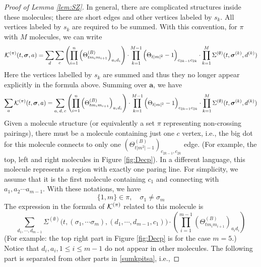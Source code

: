 \documentclass[10pt,reqno]{article}
\theoremstyle{plain} %
\theoremstyle{remark}
\numberwithin{equation}{section}
\begin{document}
\begin{proof}[ Proof of Lemma  \ref{lem:SZ}]
In general, there are complicated structures inside these molecules; there are short edges and other vertices labeled by $s_k$. All vertices labeled by $s_k$
 are required to be summed. 
With this convention,  for $\pi$  with   $M$ molecules, we can write 
\begin{align}\label{KThThSigma}
{\cal K}^{(\pi)}(t, \boldsymbol{\sigma}, \textbf{a})= 
\sum_{\textbf{d}}\sum_{\textbf{c}}\left(\prod_{i=1}^{n} \left(\Theta^{(B)}_{tm_im_{i+1}}\right)_{a_id_i}\right)\cdot \prod_{k=1}^{M-1}\Big(\Theta_{{t|m|^2}}-1\Big)_{c_{2k-1}c_{2k}}
\cdot
 \prod_{k=1}^{M}{\Sigma}^{(\emptyset)}(t, \boldsymbol{\sigma}^{(k)}, \textbf{d}^{(k)})   
\end{align}
Here the vertices labelled by $s_k$ are summed and thus they no longer appear explicitly in the formula above. 
Summing over  $\textbf{a}$,  we have 
\begin{align}\label{sumkpitsa}
\sum_{\textbf{a}}{\cal K}^{(\pi)}(t, \boldsymbol{\sigma}, \textbf{a})=
\sum_{\textbf{a},\,\textbf{d},\,\textbf{c}}\left(\prod_{i=1}^{n}  \left(\Theta^{(B)}_{tm_im_{i+1}}\right)_{a_id_i}\right)\cdot \prod_{k=1}^{M-1}\Big(\Theta_{{t|m|^2}}-1\Big)_{c_{2k-1}c_{2k}}
\cdot
 \prod_{k=1}^{M}{\Sigma}^{(\emptyset)}(t, \boldsymbol{\sigma}^{(k)}, \textbf{d}^{(k)})   
\end{align}
 Given a molecule structure (or equivalently a set $\pi$ representing non-crossing pairings), there must be a molecule  containing just one $c$ vertex, i.e., the big dot for this molecule  connects to only  one  $(\Theta^{(B)}_{t|m^2|-1})  _{c_{2k-1},c_{2k}}$ edge. (For example, the top, left and right molecules in Figure \ref{fig:Decp}). 
  In a different language, this molecule represents a region with exactly  one  paring line.  
For simplicity, we assume that it is the first molecule  containing  $c_1$ and  connecting  with $a_1,a_2\cdots a_{m-1}$. 
With these notations, we have 
\begin{equation} \label{jjshsaa0}
\{1,m \}\in \pi, \quad \sigma_1\ne \sigma_{m }
\end{equation}
The expression in the formula of ${\cal K}^{(\pi)}$ related to this molecule is 
$$
\sum_{d_1,\cdots, d_{m-1}}\Sigma^{(\emptyset)}\Bigg(t, (\sigma_1, \cdots \sigma_m), (d_1,\cdots, d_{m-1}, c_1)\Bigg)\cdot  \left(\prod_{i=1}^{m-1} \left(\Theta^{(B)}_{tm_im_{i+1}}\right)_{a_id_i}\right) 
$$
(For example: the top right part in Figure \ref{fig:Decp} is for the case $m=5$.) Notice that  $d_i, a_i, 1\le i\le m-1 $ do not  appear in other molecules.  The following part is separated  from  other parts in \eqref{sumkpitsa}, i.e., 

\end{proof}
\end{document}
